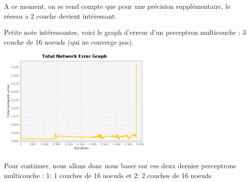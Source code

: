 \documentclass[10pt]{report}
\begin{document}
A ce moment, on se rend compte que pour une précision supplémentaire, le réseau a 2 couche devient intéressant.

Petite note intéressantes, voici le graph d'erreur d'un perceptron multicouche : 3 couche de 16 noeuds (qui ne converge pas).\\
\begin{center}
\includegraphics[height=200px]{img/SQUARE_16_16_16_101_-4.png}\\
\end{center}

Pour continuer, nous allons donc nous baser sur ces deux dernier perceptrons multicouche : 1: 1 couches de 16 noeuds et 2: 2 couches de 16 noeuds
\end{document}
